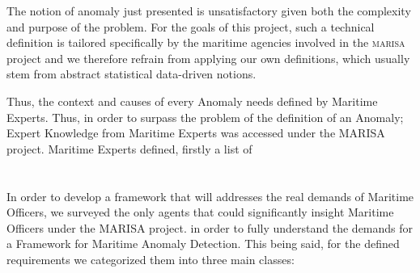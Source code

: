The notion of anomaly just presented is unsatisfactory given both the complexity and purpose of the problem. For the goals of this project, such a technical definition is tailored specifically by the maritime agencies involved in the \textsc{marisa} project and we therefore refrain from applying our own definitions, which usually stem from abstract statistical data-driven notions.

Thus, the context and causes of every Anomaly needs defined by Maritime Experts. Thus, in order to surpass the problem of the definition of an Anomaly; Expert Knowledge from Maritime Experts was accessed under the MARISA project. Maritime Experts defined, firstly a list of  \\ \\ \\  




In order to develop a framework that will addresses the real demands of Maritime Officers, we surveyed the only agents that could significantly insight Maritime Officers under the MARISA project. in order to fully understand the demands for a Framework for Maritime Anomaly Detection.
This being said, for the defined requirements we categorized them into three main classes:

